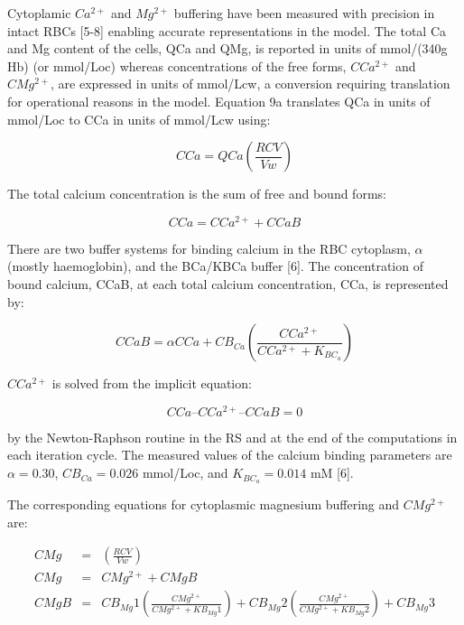 \documentclass[a4paper]{article}
\newcommand{\cell}[1]{C#1}
\newcommand{\KBCa}{K_{{BC}_a}}
\newcommand{\CMgtp}{\cell{Mg^{2+}}}
\newcommand{\CCatp}{\cell{Ca^{2+}}}
\newcommand{\CCa}{\cell{Ca}}
\newcommand{\CCaB}{\cell{CaB}}
\newcommand{\CBCa}{\cell{B_{Ca}}}
\newcommand{\CMgB}{\cell{MgB}}
\newcommand{\CMg}{\cell{Mg}}
\newcommand{\QCa}{QCa}
\begin{document}
Cytoplamic $Ca^{2+}$ and $Mg^{2+}$ buffering have been measured with precision in intact RBCs [5-8] enabling accurate representations in the model.  The total Ca and Mg content of the cells, QCa and QMg, is reported in units of mmol/(340g Hb) (or mmol/Loc) whereas concentrations of the free forms, $\CCatp$ and $\CMgtp$, are expressed in units of mmol/Lcw, a conversion requiring translation for operational reasons in the model. Equation 9a translates QCa in units of mmol/Loc to CCa in units of mmol/Lcw using:


\setcounter{equation}{0}
\renewcommand{\theequation}{9.\alph{equation}}

\begin{equation}
\CCa = \QCa\left(\frac{RCV}{Vw}\right)
\end{equation}
 

The total calcium concentration is the sum of free and bound forms:

\begin{equation}
\CCa = \CCatp + \CCaB
\end{equation}

There are two buffer systems for binding calcium in the RBC cytoplasm, $\alpha$ (mostly haemoglobin), and the BCa/KBCa buffer [6]. The concentration of bound calcium, CCaB, at each total calcium concentration, CCa, is represented by:

\begin{equation}
\CCaB = \alpha\CCa + \CBCa\left(\frac{\CCatp}{\CCatp + \KBCa}\right)
\end{equation}

$CCa^{2+}$ is solved from the implicit equation: 

\begin{equation}
\CCa – \CCatp – \CCaB = 0  
\end{equation}

by the Newton-Raphson routine in the RS and at the end of the computations in each iteration cycle.  The measured values of the calcium binding parameters are $\alpha = 0.30$, $\CBCa = 0.026$ mmol/Loc, and $\KBCa = 0.014$ mM [6].

The corresponding equations for cytoplasmic magnesium buffering and $CMg^{2+}$ are:

\begin{eqnarray}
\CMg &=& \left(\frac{RCV}{Vw}\right)\\
\CMg &=& \CMgtp + \CMgB\\
\CMgB &=& CB_{Mg}1\left(\frac{\CMgtp}{\CMgtp+KB_{Mg}1}\right)+CB_{Mg}2\left(\frac{\CMgtp}{\CMgtp+KB_{Mg}2}\right)+CB_{Mg}3
\end{eqnarray}
\end{document}
